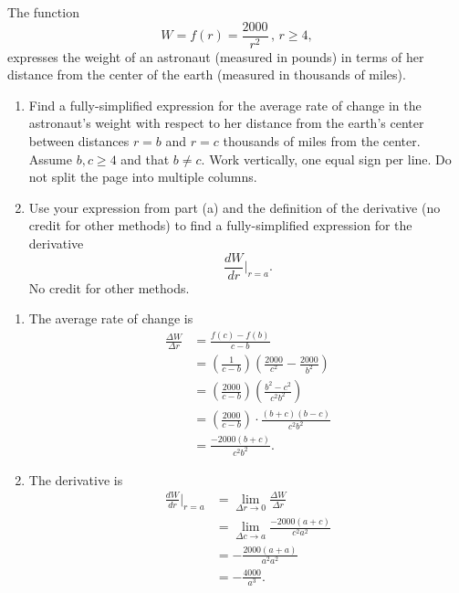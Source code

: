 \documentclass{ximera}
\begin{document}
\begin{question} \label{Qldfe430}
The function
\[
    W = f(r) = \frac{2000}{r^2} \, , \, r \geq 4,
\]
expresses the weight of an astronaut (measured in pounds) in terms of her distance from the center of the earth (measured in thousands of miles).

\begin{enumerate}

\item Find a fully-simplified expression for the average rate of change in the astronaut’s weight with respect to her distance from the earth’s center between distances $r=b$ and $r=c$ thousands of miles from the center. Assume $b,c \geq 4$ and that $b\neq c$. Work vertically, one equal sign per line. Do not split the page into multiple columns.

\item Use your expression from part (a) and the definition of the derivative (no credit for other methods) to find a fully-simplified expression for the derivative
\[
  \frac{dW}{dr}\Big|_{r=a}.
\]
No credit for other methods.
\end{enumerate}


\begin{explanation}
\begin{enumerate}
\item The average rate of change is
\begin{align*}
  \frac{\Delta W}{\Delta r} &= \frac{f(c) - f(b)}{c-b}  \\
                                       &= \left(\frac{1}{c-b}\right) \left( \frac{2000}{c^2} - \frac{2000}{b^2} \right) \\
                                       &=\left(\frac{2000}{c-b}\right) \left( \frac{b^2-c^2}{c^2 b^2} \right) \\
                                        &=\left(\frac{2000}{c-b}\right) \cdot \frac{(b+c)(b-c)}{c^2 b^2}  \\
                                        &= \frac{-2000(b+c)}{c^2 b^2} .
\end{align*}

\item The derivative is
\begin{align*}
           \frac{dW}{dr}\Big|_{r=a} &= \lim_{\Delta r\to 0} \frac{\Delta W}{\Delta r}  \\
                                                 &= \lim_{\Delta c\to a} \frac{-2000(a+c)}{c^2 a^2}  \\
                                                 &= -\frac{2000(a+a)}{a^2 a^2} \\
                                                 &= -\frac{4000}{a^3} .
\end{align*}
\end{enumerate}
\end{explanation}
\end{question}
\end{document}
